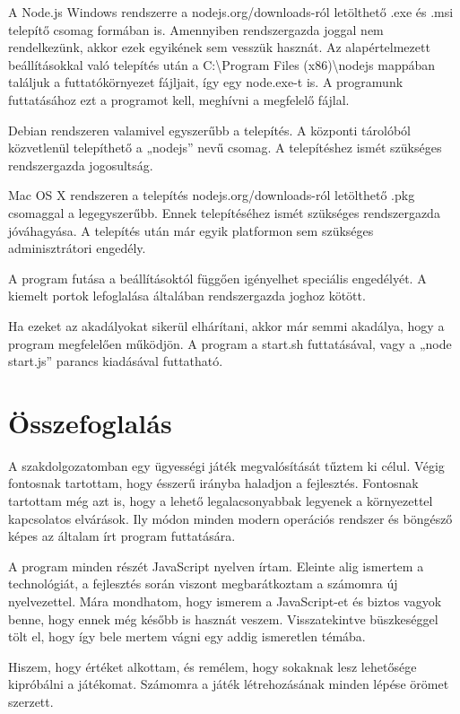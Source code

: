 \documentclass[bibliography=totocnumbered]{article}
\begin{document}
A Node.js Windows rendszerre a nodejs.org/downloads-ról letölthető .exe
és .msi telepítő csomag formában is. Amennyiben rendszergazda joggal nem
rendelkezünk, akkor ezek egyikének sem vesszük hasznát. Az
alapértelmezett beállításokkal való telepítés után a
C:\textbackslash{}Program Files (x86)\textbackslash{}nodejs mappában
találjuk a futtatókörnyezet fájljait, így egy node.exe-t is. A
programunk futtatásához ezt a programot kell, meghívni a megfelelő
fájlal.

Debian rendszeren valamivel egyszerűbb a telepítés. A központi tárolóból
közvetlenül telepíthető a „nodejs'' nevű csomag. A telepítéshez ismét
szükséges rendszergazda jogosultság.

Mac OS X rendszeren a telepítés nodejs.org/downloads-ról letölthető .pkg
csomaggal a legegyszerűbb. Ennek telepítéséhez ismét szükséges
rendszergazda jóváhagyása. A telepítés után már egyik platformon sem
szükséges adminisztrátori engedély.

A program futása a beállításoktól függően igényelhet speciális
engedélyét. A kiemelt portok lefoglalása általában rendszergazda joghoz
kötött.

Ha ezeket az akadályokat sikerül elhárítani, akkor már semmi akadálya,
hogy a program megfelelően működjön. A program a start.sh futtatásával,
vagy a „node start.js'' parancs kiadásával futtatható.


\section{Összefoglalás}

A szakdolgozatomban egy ügyességi játék megvalósítását tűztem ki célul.
Végig fontosnak tartottam, hogy ésszerű irányba haladjon a fejlesztés.
Fontosnak tartottam még azt is, hogy a lehető legalacsonyabbak legyenek
a környezettel kapcsolatos elvárások. Ily módon minden modern operációs
rendszer és böngésző képes az általam írt program futtatására.

A program minden részét JavaScript nyelven írtam. Eleinte alig ismertem
a technológiát, a fejlesztés során viszont megbarátkoztam a számomra új
nyelvezettel. Mára mondhatom, hogy ismerem a JavaScript-et és biztos
vagyok benne, hogy ennek még később is hasznát veszem. Visszatekintve
büszkeséggel tölt el, hogy így bele mertem vágni egy addig ismeretlen
témába.

Hiszem, hogy értéket alkottam, és remélem, hogy sokaknak lesz lehetősége
kipróbálni a játékomat. Számomra a játék létrehozásának minden lépése
örömet szerzett.
\end{document}

